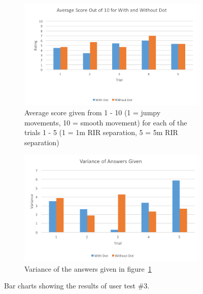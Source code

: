 \documentclass[../../main.tex]{subfiles}
\begin{document}
				\begin{figure}[H]
					\begin{subfigure}{1\textwidth}
						\centerline{\includegraphics[scale = 0.7]{Sections/userTesting/images/test3/Q3Score.png}}
						\caption{Average score given from 1 - 10 (1 = jumpy movements, 10 = smooth movement) for each of the trials 1 - 5 (1 = 1m \ac{RIR} separation, 5 = 5m \ac{RIR} separation)}
						\label{score}
					\end{subfigure}
					
					\begin{subfigure}{1\textwidth}
						\centerline{\includegraphics[scale = 0.7]{Sections/userTesting/images/test3/Q3Variance.png}}
						\caption{Variance of the answers given in figure~\ref{score}}
						\label{variance}
					\end{subfigure}
					\caption{Bar charts showing the results of user test \#3.}
					\label{test1Results}
				\end{figure}
\end{document}
